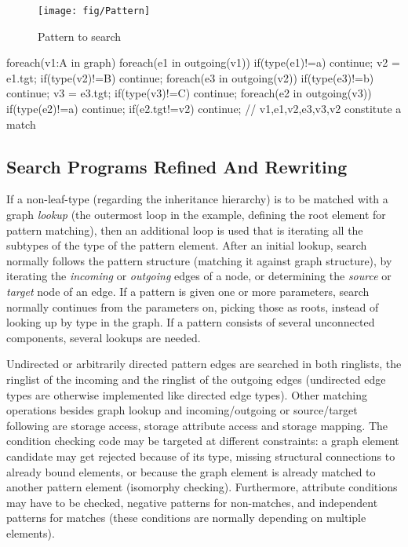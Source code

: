 \begin{figure}[htbp]
  \centering
  \texttt{[image: fig/Pattern]}
  \caption{Pattern to search}
  \label{figpatterntosearchfirst}
\end{figure}

\begin{csharp}
foreach(v1:A in graph) {
	foreach(e1 in outgoing(v1)) {
		if(type(e1)!=a) continue;
		v2 = e1.tgt;
		if(type(v2)!=B) continue;
		foreach(e3 in outgoing(v2)) {
			if(type(e3)!=b) continue;
			v3 = e3.tgt;
			if(type(v3)!=C) continue;
			foreach(e2 in outgoing(v3)) {
				if(type(e2)!=a) continue;
				if(e2.tgt!=v2) continue;
				// v1,e1,v2,e3,v3,v2 constitute a match
			} 
		}
	}
}
\end{csharp}

\pagebreak

\subsection*{Search Programs Refined And Rewriting} %

If a non-leaf-type (regarding the inheritance hierarchy) is to be matched with a graph \emph{lookup} (the outermost loop in the example, defining the root element for pattern matching), then an additional loop is used that is iterating all the subtypes of the type of the pattern element.
After an initial lookup, search normally follows the pattern structure (matching it against graph structure), by iterating the \emph{incoming} or \emph{outgoing} edges of a node, or determining the \emph{source} or \emph{target} node of an edge.
If a pattern is given one or more parameters, search normally continues from the parameters on, picking those as roots, instead of looking up by type in the graph.
If a pattern consists of several unconnected components, several lookups are needed.

Undirected or arbitrarily directed pattern edges are searched in both ringlists, the ringlist of the incoming and the ringlist of the outgoing edges (undirected edge types are otherwise implemented like directed edge types).
Other matching operations besides graph lookup and incoming/outgoing or source/target following are storage access, storage attribute access and storage mapping.
The condition checking code may be targeted at different constraints:
a graph element candidate may get rejected because of its type, missing structural connections to already bound elements, or because the graph element is already matched to another pattern element (isomorphy checking).
Furthermore, attribute conditions may have to be checked, negative patterns for non-matches, and independent patterns for matches (these conditions are normally depending on multiple elements).

